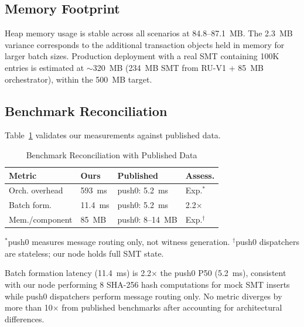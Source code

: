 \subsection{Memory Footprint}

Heap memory usage is stable across all scenarios at 84.8--87.1~MB. The
2.3~MB variance corresponds to the additional transaction objects held in
memory for larger batch sizes. Production deployment with a real SMT
containing 100K entries is estimated at $\sim$320~MB (234~MB SMT from
RU-V1 + 85~MB orchestrator), within the 500~MB target.

\subsection{Benchmark Reconciliation}

Table~\ref{tab:reconcile} validates our measurements against published data.

\begin{table}[htbp]
\centering
\caption{Benchmark Reconciliation with Published Data}
\label{tab:reconcile}
\small
\begin{tabular}{@{}llll@{}}
\toprule
\textbf{Metric} & \textbf{Ours} & \textbf{Published} & \textbf{Assess.} \\
\midrule
Orch. overhead   & 593~ms  & push0: 5.2~ms   & Exp.$^*$ \\
Batch form.      & 11.4~ms & push0: 5.2~ms   & 2.2$\times$ \\
Mem./component   & 85~MB   & push0: 8--14~MB & Exp.$^\dagger$ \\
\bottomrule
\end{tabular}
\begin{flushleft}
\small $^*$push0 measures message routing only, not witness generation.
$^\dagger$push0 dispatchers are stateless; our node holds full SMT state.
\end{flushleft}
\end{table}

Batch formation latency (11.4~ms) is 2.2$\times$ the push0 P50 (5.2~ms),
consistent with our node performing 8 SHA-256 hash computations for mock
SMT inserts while push0 dispatchers perform message routing only. No metric
diverges by more than 10$\times$ from published benchmarks after accounting
for architectural differences.
